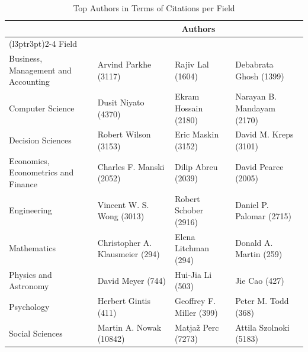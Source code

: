 \documentclass[
  12pt,
]{article}
\begin{document}
\begin{table}[H]

\caption{\label{tab:authors per field}Top Authors in Terms of Citations per Field}
\centering
\fontsize{8}{10}\selectfont
\begin{tabular}[t]{llll}
\toprule
\multicolumn{1}{c}{ } & \multicolumn{3}{c}{Authors} \\
\cmidrule(l{3pt}r{3pt}){2-4}
Field &  &  & \\
\midrule
Business, Management and Accounting & Arvind Parkhe (3117) & Rajiv Lal (1604) & Debabrata Ghosh (1399)\\
Computer Science & Dusit Niyato (4370) & Ekram Hossain (2180) & Narayan B. Mandayam (2170)\\
Decision Sciences & Robert Wilson (3153) & Eric Maskin (3152) & David M. Kreps (3101)\\
Economics, Econometrics and Finance & Charles F. Manski (2052) & Dilip Abreu (2039) & David Pearce (2005)\\
Engineering & Vincent W. S. Wong (3013) & Robert Schober (2916) & Daniel P. Palomar (2715)\\
Mathematics & Christopher A. Klausmeier (294) & Elena Litchman (294) & Donald A. Martin (259)\\
Physics and Astronomy & David Meyer (744) & Hui‐Jia Li (503) & Jie Cao (427)\\
Psychology & Herbert Gintis (411) & Geoffrey F. Miller (399) & Peter M. Todd (368)\\
Social Sciences & Martin A. Nowak (10842) & Matjaž Perc (7273) & Attila Szolnoki (5183)\\
\bottomrule
\end{tabular}
\end{table}
\end{document}
